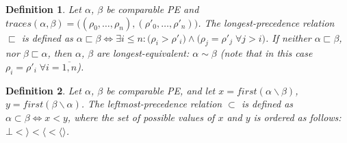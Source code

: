 \documentclass[AMA,STIX1COL]{WileyNJD-v2}
\newcommand{\Xl}{\langle}
\newcommand{\Xr}{\rangle}
\newcommand{\Xm}{\langle\!\rangle}
\newtheorem{Xdef}{Definition}
\begin{document}
    \begin{Xdef}\label{prec1}
    Let $\alpha$, $\beta$ be comparable PE and
    $traces(\alpha, \beta) = \big( (\rho_0, \dots, \rho_n), (\rho'_0, \dots, \rho'_n) \big)$.
    The \emph{longest-precedence} relation $\sqsubset$ is defined as
    $\alpha \sqsubset \beta \Leftrightarrow \exists i \leq n:
        \big( \rho_i > \rho'_i \big) \wedge
        \big( \rho_j = \rho'_j \; \forall j > i \big)$.
    If neither $\alpha \sqsubset \beta$, nor $\beta \sqsubset \alpha$,
    then $\alpha$, $\beta$ are \emph{longest-equivalent}: $\alpha \sim \beta$
    (note that in this case $\rho_i = \rho'_i \; \forall i = \overline {1, n}$).
    \end{Xdef}

    \begin{Xdef}\label{prec2}
    Let $\alpha$, $\beta$ be comparable PE, and let
    $x = first (\alpha \backslash \beta)$,
    $y = first (\beta \backslash \alpha)$.
    The \emph{leftmost-precedence} relation $\subset$ is defined as
    $\alpha \subset \beta \Leftrightarrow x < y$, where
    the set of possible values of $x$ and $y$ is ordered as follows:
    $\bot < \Xr < \Xl < \Xm$.
%
    \end{Xdef}
\end{document}
